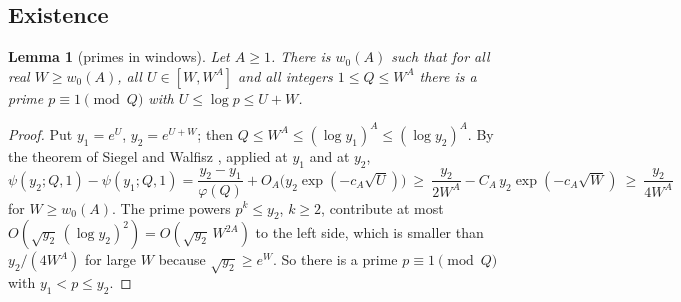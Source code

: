 \documentclass[10pt]{amsart}
\newtheorem{lemma}[theorem]{Lemma}
\theoremstyle{definition}
\theoremstyle{remark}
\begin{document}
\subsection{Existence}\label{an:ssec-exist}
\begin{lemma}[primes in windows]\label{an:lem-windows}
Let $A\ge1$. There is $w_0(A)$ such that for all real $W\ge w_0(A)$, all
$U\in[W,W^{A}]$ and all integers $1\le Q\le W^{A}$ there is a prime
$p\equiv1\pmod Q$ with $U\le\log p\le U+W$.
\end{lemma}
\begin{proof}
Put $y_1=e^{U}$, $y_2=e^{U+W}$; then
$Q\le W^{A}\le(\log y_1)^{A}\le(\log y_2)^{A}$. By the theorem of Siegel and
Walfisz \cite[Chapter~22]{Davenport}, applied at $y_1$ and at $y_2$,
\[
 \psi(y_2;Q,1)-\psi(y_1;Q,1)=\frac{y_2-y_1}{\varphi(Q)}+O_A\bigl(y_2\exp(-c_A\sqrt U)\bigr)\ \ge\ \frac{y_2}{2W^{A}}-C_A\,y_2\exp(-c_A\sqrt W)\ \ge\ \frac{y_2}{4W^{A}}
\]
for $W\ge w_0(A)$. The prime powers $p^{k}\le y_2$, $k\ge2$, contribute at
most $O(\sqrt{y_2}\,(\log y_2)^2)=O(\sqrt{y_2}\,W^{2A})$ to the left side,
which is smaller than $y_2/(4W^{A})$ for large $W$ because $\sqrt{y_2}\ge e^{W}$. So there
is a prime $p\equiv1\pmod Q$ with $y_1<p\le y_2$.
\end{proof}
\end{document}
